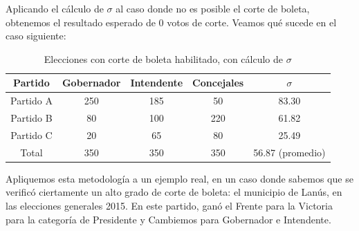 \documentclass[12pt,a4paper]{article}
\begin{document}
\pagebreak

Aplicando el cálculo de $\sigma$ al caso donde no es posible el corte de boleta,
obtenemos el resultado esperado de 0 votos de corte. Veamos qué sucede en el
caso siguiente:

\renewcommand{\arraystretch}{1.25}
\begin{table}[h!]
\centering
\begin{tabular}{c c c c c} 
 Partido & Gobernador & Intendente & Concejales & $\sigma$ \\ [0.5ex] 
 \hline
Partido A & 250 & 185 & 50 & 83.30 \\
Partido B & 80 & 100 & 220 & 61.82 \\
Partido C & 20 & 65 & 80 & 25.49 \\
 \hline
Total & 350 & 350 & 350 & 56.87 (promedio) \\ [1ex]
 \hline
\end{tabular}
\caption{Elecciones con corte de boleta habilitado, con cálculo de $\sigma$}
\label{table:1}
\end{table}

Apliquemos esta metodología a un ejemplo real, en un caso donde sabemos que se verificó
ciertamente un alto grado de corte de boleta: el municipio de Lanús, en las
elecciones generales 2015. En este partido, ganó el Frente para la Victoria para
la categoría de Presidente y Cambiemos para Gobernador e Intendente.
\end{document}
